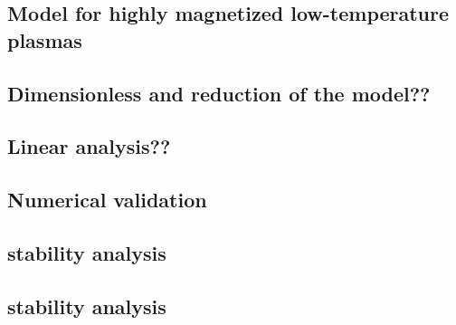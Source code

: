 		\subsection{Model for highly magnetized low-temperature plasmas}
		\subsection{Dimensionless and reduction of the model??}
		\subsection{Linear analysis??}
		\subsection{Numerical validation}
		\subsection{stability analysis}
		\subsection{stability analysis}
